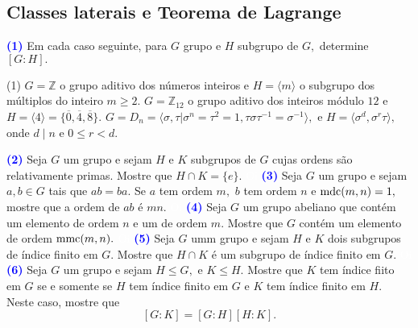 \documentclass[12pt, a4paper]{article}
\newcommand{\mmc}{{\rm mmc}}
\newcommand{\mdc}{{\rm mdc}}
\newcommand{\negrito}[1]{\mbox{\boldmath{$#1$}}}
\begin{document}
\subsection{\textcolor{Floresta}{Classes laterais e Teorema de Lagrange}}
\textcolor{blue}{\bf(1)}\label{33} Em cada caso seguinte, para $G$ grupo e $H$ subgrupo de $G,$ determine $[G : H].$
\begin{tasks}[counter-format={(tsk[a])},label-width=3.6ex, label-format = {\bfseries}, column-sep = {0pt}](1)
\task[\textcolor{Floresta}{$\negrito{(a)} $}] $G = \mathbb{Z}$ o grupo aditivo dos números inteiros e $H = \langle m \rangle$ o subgrupo dos múltiplos do inteiro $m \ge 2.$ %
\task[\textcolor{Floresta}{$\negrito{(b)} $}] $G = \mathbb{Z}_{12}$ o grupo aditivo dos inteiros módulo $12$ e $H = \langle 4 \rangle = \{\overline{0},\overline{4},\overline{8}\}.$%
\task[\textcolor{Floresta}{$\negrito{(c)} $}] $G = D_n = \langle \sigma, \tau | \sigma^n = \tau^2 = 1, \tau \sigma \tau^{-1} = \sigma^{-1} \rangle,$ e $H = \langle \sigma^d, \sigma^r \tau \rangle,$ onde $d \mid n$ e $0 \le r < d.$%
\end{tasks}
\textcolor{blue}{\bf(2)}\label{34} Seja $G$ um grupo e sejam $H$ e $K$ subgrupos de $G$ cujas ordens são relativamente primas. Mostre que $H \cap K = \{ e \}.$
\textcolor{white}{Oi}\newline\newline
\textcolor{blue}{\bf(3)}\label{35} Seja $G$ um grupo e sejam $a,b \in G$ tais que $ab=ba.$ Se $a$ tem ordem $m,$ $b$ tem ordem $n$ e $\mdc(m,n) = 1,$ mostre que a ordem de $ab$ é $mn.$
\textcolor{white}{Oi}\newline\newline
\textcolor{blue}{\bf(4)}\label{36} Seja $G$ um grupo abeliano que contém um elemento de ordem $n$ e um de ordem $m.$ Mostre que $G$ contém um elemento de ordem $\mmc(m,n).$
\textcolor{white}{Oi}\newline\newline
\textcolor{blue}{\bf(5)}\label{37} Seja $G$ umm grupo e sejam $H$ e $K$ dois subgrupos de índice finito em $G.$ Mostre que $H \cap K$ é um subgrupo de índice finito em $G.$
\textcolor{white}{Oi}\newline\newline
\textcolor{blue}{\bf(6)}\label{38} Seja $G$ um grupo e sejam $H \le G,$ e $K \le H.$ Mostre que $K$ tem índice fiito em $G$ se e somente se $H$ tem índice finito em $G$ e $K$ tem índice finito em $H.$ Neste caso, mostre que \[[G:K] = [G : H][H : K].\]
\newpage
\end{document}
